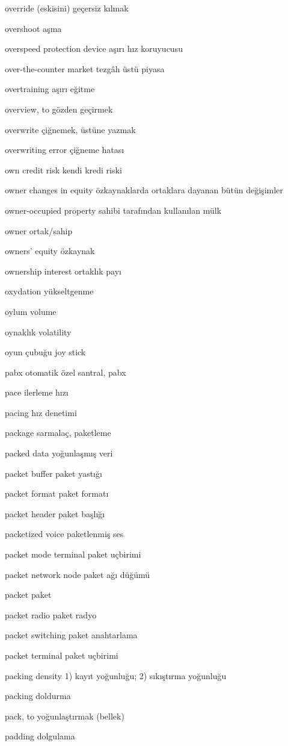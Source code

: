 \documentclass[12pt,fleqn]{article}\usepackage{../../common}
\begin{document}
override (eskisini) geçersiz kılmak

overshoot aşma

overspeed protection device aşırı hız koruyucusu

over-the-counter market tezgâh üstü piyasa

overtraining aşırı eğitme

overview, to gözden geçirmek

overwrite çiğnemek, üstüne yazmak

overwriting error çiğneme hatası

own credit risk kendi kredi riski

owner changes in equity özkaynaklarda ortaklara dayanan bütün değişimler

owner-occupied property sahibi tarafından kullanılan mülk

owner ortak/sahip

owners' equity özkaynak

ownership interest ortaklık payı

oxydation yükseltgenme

oylum volume

oynaklık volatility

oyun çubuğu joy stick

pabx otomatik özel santral, pabx

pace ilerleme hızı

pacing hız denetimi

package sarmalaç, paketleme

packed data yoğunlaşmış veri

packet buffer paket yastığı

packet format paket formatı

packet header paket başlığı

packetized voice paketlenmiş ses

packet mode terminal paket uçbirimi

packet network node paket ağı düğümü

packet paket

packet radio paket radyo

packet switching paket anahtarlama

packet terminal paket uçbirimi

packing density 1) kayıt yoğunluğu; 2) sıkıştırma yoğunluğu

packing doldurma

pack, to yoğunlaştırmak (bellek)

padding dolgulama
\end{document}
